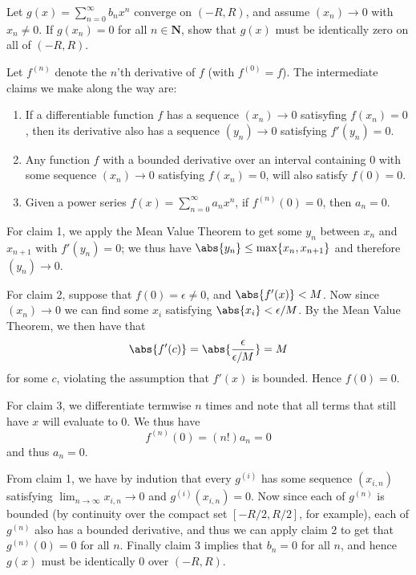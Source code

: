 \begin{exercise}
Let $g(x)=\sum_{n=0}^{\infty} b_{n} x^{n}$ converge on $(-R, R)$, and assume $\left(x_{n}\right) \rightarrow 0$ with $x_{n} \neq 0$. If $g\left(x_{n}\right)=0$ for all $n \in \mathbf{N}$, show that $g(x)$ must be identically zero on all of $(-R, R)$.
\end{exercise}

\begin{solution}
Let \(f^{(n)}\) denote the \(n\)'th derivative of \(f\) (with \(f^{(0)} = f\)). The intermediate claims we make along the way are:
\begin{enumerate}
    \item  If a differentiable function \(f\) has a sequence \((x_n) \to 0\) satisyfing \(f(x_n) = 0\), then its derivative also has a sequence \((y_n) \to 0\) satisfying \(f'(y_n) = 0\).
    \item  Any function \(f\) with a bounded derivative over an interval containing 0 with some sequence \((x_n) \to 0\) satisfying \(f(x_n) = 0\), will also satisfy \(f(0) = 0\).
    \item  Given a power series \(f(x) = \sum^\infty_{n=0}a_nx^n\), if \(f^{(n)}(0) = 0\), then \(a_n = 0\).
\end{enumerate}

For claim 1, we apply the Mean Value Theorem to get some \(y_n\) between \(x_n\) and \(x_{n+1}\) with \(f'(y_n) = 0\); we thus have \(\abs{y_n} \leq \max\{x_n, x_{n+1}\}\) and therefore \((y_n) \to 0\).

For claim 2, suppose that \(f(0) = \epsilon \neq 0\), and \(\abs{f'(x)} < M\). Now since \((x_n) \to 0\) we can find some \(x_i\) satisfying \(\abs{x_i} < \epsilon / M\). By the Mean Value Theorem, we then have that
\[\abs{f'(c)} = \abs{\frac{\epsilon}{\epsilon/M}} = M\]
for some \(c\), violating the assumption that \(f'(x)\) is bounded. Hence \(f(0) = 0\).

For claim 3, we differentiate termwise \(n\) times and note that all terms that still have \(x\) will evaluate to 0. We thus have
\[f^{(n)}(0) = (n!)a_n = 0\]
and thus \(a_n = 0\).

From claim 1, we have by indution that every \(g^{(i)}\) has some sequence \((x_{i,n})\) satisfying \(\lim_{n \to \infty} x_{i,n} \to 0\) and \(g^{(i)}(x_{i,n}) = 0\). Now since each of \(g^{(n)}\) is bounded (by continuity over the compact set \([-R/2, R/2]\), for example), each of \(g^{(n)}\) also has a bounded derivative, and thus we can apply claim 2 to get that \(g^{(n)}(0) = 0\) for all \(n\). Finally claim 3 implies that \(b_n = 0\) for all \(n\), and hence \(g(x)\) must be identically 0 over \((-R, R)\).
\end{solution}

